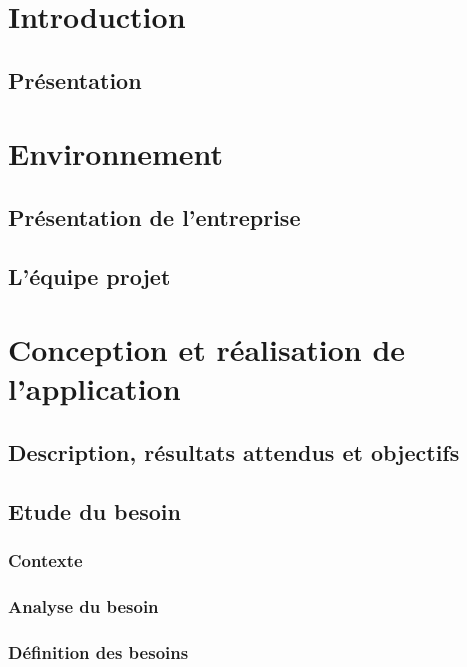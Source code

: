 \documentclass[a4paper, 11pt]{report}
\begin{document}


\dominitoc
\tableofcontents



\chapter{Introduction}
\minitoc       

    \section{Présentation}

\chapter{Environnement}
\minitoc

    \section{Présentation de l'entreprise}
    \section{L'équipe projet}
    
\chapter{Conception et réalisation de l'application}
\minitoc 

    \section{Description, résultats attendus et objectifs}
    \section{Etude du besoin}
        \subsection{Contexte}
        \subsection{Analyse du besoin}
        \subsection{Définition des besoins}
        
\end{document}
